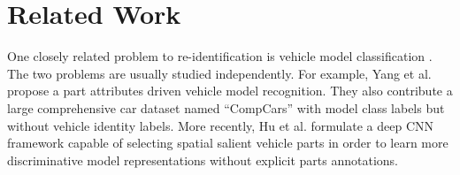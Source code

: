 \documentclass[10pt,twocolumn,letterpaper]{article}
\newcommand{\todo}[1]{}
\renewcommand{\todo}[1]{{\color{red} TODO: {#1}}}
\begin{document}

%

\section{Related Work}

One closely related problem to re-identification is vehicle model
classification
\cite{liao2015exploiting,yang2015compcars,sochor2016boxcars,hu2017deep}.
The two problems are usually studied independently.
For example, Yang et al. \cite{yang2015compcars} propose a part attributes driven
vehicle model recognition.
They also contribute a large comprehensive car dataset named ``CompCars''
with model class labels but without vehicle identity labels.
More recently, Hu et al. \cite{hu2017deep} formulate a deep CNN framework capable of
selecting spatial salient vehicle parts in order to learn more
discriminative model representations without explicit parts annotations.
\end{document}
